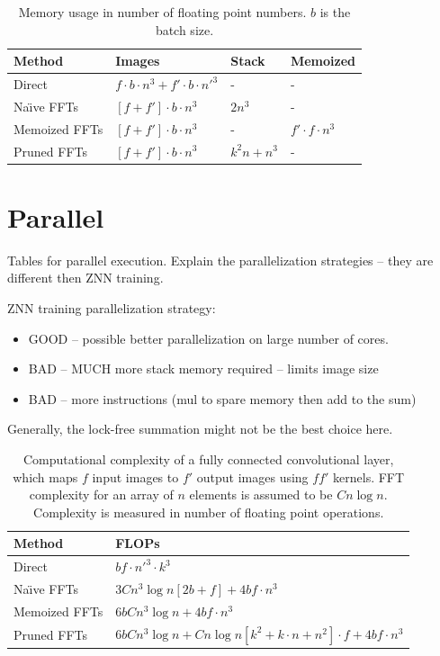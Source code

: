 \documentclass[conference]{IEEEtran}
\begin{document}
\begin{table}
  \centering
  \begin{tabular}{llll}
    \hline
    Method    &Images   &Stack   &Memoized
    \\ \hline
    Direct & $f \cdot b \cdot n^3 + f' \cdot b \cdot n'^3$ & - & -
    \\
    Na\"{\i}ve FFTs & $[f + f'] \cdot b \cdot  n^3$ & $2n^3$ & -
    \\
    Memoized FFTs & $[f + f'] \cdot b \cdot  n^3$ & - & $f' \cdot f \cdot n^3$
    \\
    Pruned FFTs & $[f + f'] \cdot b \cdot  n^3$ & $k^2n + n^3$ & -
    \\ \hline
  \end{tabular}
  \caption{Memory usage in number of floating point numbers. $b$ is
    the batch size.}
  \label{table:conv_memory}
\end{table}


\section{Parallel}

Tables for parallel execution.  Explain the parallelization strategies
-- they are different then ZNN training.

ZNN training parallelization strategy:

\begin{itemize}
\item GOOD -- possible better parallelization on large number of cores.
\item BAD -- MUCH more stack memory required -- limits image size
\item BAD -- more instructions (mul to spare memory then add to the sum)
\end{itemize}

Generally, the lock-free summation might not be the best choice here.

\begin{table}
  \centering
  \begin{tabular}{ll}
    \hline
    Method    &FLOPs
    \\ \hline
    Direct & $bf \cdot n'^3 \cdot k^3$
    \\
    Na\"{\i}ve FFTs & $3Cn^3 \log n[2b + f] + 4b f \cdot n^3$
    \\
    Memoized FFTs & $6bCn^3 \log n + 4b f \cdot n^3$
    \\
    Pruned FFTs & $6bCn^3 \log n + C n\log n[k^2 + k \cdot n + n^2] \cdot f + 4b f \cdot n^3$
    \\ \hline
  \end{tabular}
  \caption{Computational complexity of a fully connected convolutional
    layer, which maps $f$ input images to $f'$ output images using
    $ff'$ kernels. FFT complexity for an array of $n$ elements is
    assumed to be $Cn\log n$.  Complexity is measured in number of
    floating point operations.}
  \label{table:conv_complexity}
\end{table}
\end{document}
